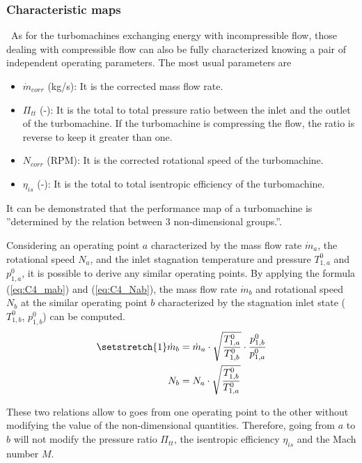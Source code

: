 \subsubsection{Characteristic maps}
\quad\ As for the turbomachines exchanging energy with incompressible flow, those dealing with compressible flow can also be fully characterized knowing a pair of independent operating parameters. The most usual parameters are

\begin{itemize}
    \item \(\dot{m}_{corr}\) (kg/s): It is the corrected mass flow rate.
    \item \(\Pi_{tt}\) (-): It is the total to total pressure ratio between the inlet and the outlet of the turbomachine. If the turbomachine is compressing the flow, the ratio is reverse to keep it greater than one.
    \item \(N_{corr}\) (RPM): It is the corrected rotational speed of the turbomachine. 
    \item \(\eta_{is}\) (-): It is the total to total isentropic efficiency of the turbomachine.
\end{itemize}
It can be demonstrated that the performance map of a turbomachine is ''determined by the relation between 3 non-dimensional groups.''\cite{Hillewaert2019}. 

Considering an operating point $a$ characterized by the mass flow rate $\dot{m}_a$, the rotational speed $N_a$, and the inlet stagnation temperature and pressure $T^0_{1,a}$ and $p^0_{1,a}$, it is possible to derive any similar operating points. By applying the formula (\ref{eq:C4_mab}) and (\ref{eq:C4_Nab}), the mass flow rate $\dot{m}_b$ and rotational speed $N_b$ at the similar operating point $b$ characterized by the stagnation inlet state ($T^0_{1,b}$, $p^0_{1,b}$) can be computed.
\begin{subequations}
\begin{align}
\setstretch{1}
    \dot{m}_{b} &= \dot{m}_{a}\cdot\sqrt{\frac{T^0_{1,a}}{T^0_{1,b}}}\cdot\frac{p^0_{1,b}}{p^0_{1,a}}\label{eq:C4_mab}\\
    N_b &= N_a\cdot \sqrt{\frac{T^0_{1,b}}{T^0_{1,a}}}\label{eq:C4_Nab}
\end{align}    
\end{subequations}

These two relations allow to goes from one operating point to the other without modifying the value of the non-dimensional quantities. Therefore, going from $a$ to $b$ will not modify the pressure ratio $\Pi_{tt}$, the isentropic efficiency $\eta_{is}$ and the Mach number $M$.


